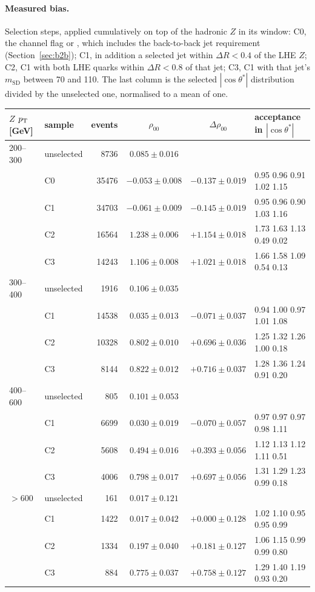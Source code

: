 \paragraph{Measured bias.} Selection steps, applied cumulatively on top of the hadronic $Z$ in its window:
C0, the channel flag  or , which includes the back-to-back jet requirement
(Section~\ref{sec:b2b}); C1, in addition a selected jet within $\Delta R < 0.4$ of the LHE $Z$; C2, C1 with both LHE
quarks within $\Delta R < 0.8$ of that jet; C3, C1 with that jet's $m_\mathrm{SD}$ between 70 and 110\GeV. The last
column is the selected $|\cos\theta^*|$ distribution divided by the unselected one, normalised to a mean of one.
\begin{center}
\small
\begin{tabular}{llrccl}
\toprule
$Z$ $p_{\mathrm{T}}$ [GeV] & sample & events & $\rho_{00}$ & $\Delta\rho_{00}$ & acceptance in $|\cos\theta^*|$ \\
\midrule
200--300 & unselected & 8736 & $0.085 \pm 0.016$ & & \\
 & C0 & 35476 & $-0.053 \pm 0.008$ & $-0.137 \pm 0.019$ & 0.95 0.96 0.91 1.02 1.15 \\
 & C1 & 34703 & $-0.061 \pm 0.009$ & $-0.145 \pm 0.019$ & 0.95 0.96 0.90 1.03 1.16 \\
 & C2 & 16564 & $1.238 \pm 0.006$ & $+1.154 \pm 0.018$ & 1.73 1.63 1.13 0.49 0.02 \\
 & C3 & 14243 & $1.106 \pm 0.008$ & $+1.021 \pm 0.018$ & 1.66 1.58 1.09 0.54 0.13 \\
300--400 & unselected & 1916 & $0.106 \pm 0.035$ & & \\
 & C1 & 14538 & $0.035 \pm 0.013$ & $-0.071 \pm 0.037$ & 0.94 1.00 0.97 1.01 1.08 \\
 & C2 & 10328 & $0.802 \pm 0.010$ & $+0.696 \pm 0.036$ & 1.25 1.32 1.26 1.00 0.18 \\
 & C3 & 8144 & $0.822 \pm 0.012$ & $+0.716 \pm 0.037$ & 1.28 1.36 1.24 0.91 0.20 \\
400--600 & unselected & 805 & $0.101 \pm 0.053$ & & \\
 & C1 & 6699 & $0.030 \pm 0.019$ & $-0.070 \pm 0.057$ & 0.97 0.97 0.97 0.98 1.11 \\
 & C2 & 5608 & $0.494 \pm 0.016$ & $+0.393 \pm 0.056$ & 1.12 1.13 1.12 1.11 0.51 \\
 & C3 & 4006 & $0.798 \pm 0.017$ & $+0.697 \pm 0.056$ & 1.31 1.29 1.23 0.99 0.18 \\
$> 600$ & unselected & 161 & $0.017 \pm 0.121$ & & \\
 & C1 & 1422 & $0.017 \pm 0.042$ & $+0.000 \pm 0.128$ & 1.02 1.10 0.95 0.95 0.99 \\
 & C2 & 1334 & $0.197 \pm 0.040$ & $+0.181 \pm 0.127$ & 1.06 1.15 0.99 0.99 0.80 \\
 & C3 & 884 & $0.775 \pm 0.037$ & $+0.758 \pm 0.127$ & 1.29 1.40 1.19 0.93 0.20 \\
\bottomrule
\end{tabular}
\end{center}
